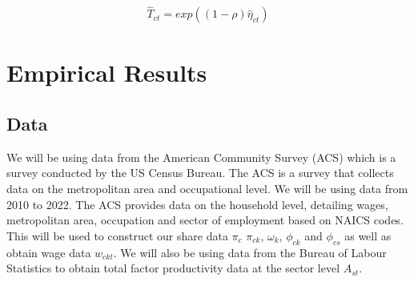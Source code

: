 \documentclass[10pt]{article}
\begin{document}
\begin{align*}
    \hat{T}_{ct} = exp \left( (1 - \rho) \hat{\eta}_{ct} \right)
\end{align*}

\section{Empirical Results}

\subsection{Data}

We will be using data from the American Community Survey (ACS) which is a survey conducted by the US Census Bureau. The ACS is a survey that collects data on the metropolitan area and occupational level. We will be using data from 2010 to 2022. The ACS provides data on the household level, detailing wages, metropolitan area, occupation and sector of employment based on NAICS codes. This will be used to construct our share data $\pi_c$ $\pi_{ck}$, $\omega_k$, $\phi_{ck}$ and $\phi_{cs}$ as well as obtain wage data $w_{ckt}$. We will also be using data from the Bureau of Labour Statistics to obtain total factor productivity data at the sector level $A_{st}$.
\end{document}
